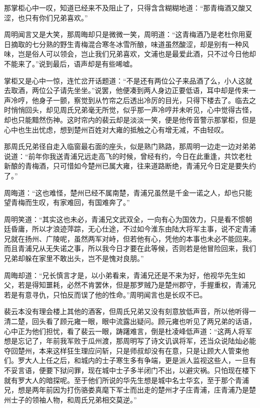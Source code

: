 那掌柜心中一叹，知道已经来不及阻止了，只得含含糊糊地道：“那青梅酒又酸又涩，也只有你们兄弟喜欢。”

周明闻言又是大笑，那周晦却只是微微一笑，周明道：“这青梅酒乃是老杜你用夏日摘取的七分熟的野生青梅混合寒冬冰雪所酿，味道虽然酸涩，却是别有一种风味，岂是俗人可以领会，岂止我们兄弟喜欢，文浦也是最爱此酒，只不过今日他却不能来了。”说到最后，语声却是有些唏嘘。

掌柜又是心中一惊，连忙岔开话题道：“不是还有两位公子来品酒了么，小人这就去取酒，两位公子请先坐坐。”说罢，他便凑到两人身边正要低语，耳中却是传来一声冷哼，他身子一颤，察觉到从竹帘之后透出冷厉的目光，只得下楼去了。临去之时悄悄回头，却见周氏兄弟毫无所觉，似乎那一声冷哼并未听见，心中觉得古怪，却也只能黯然伤神。这时帘内的裴云却是淡淡一笑，便是他传音警示那掌柜，但是心中也生出忧虑，想到楚州百姓对大雍的抵触之心有增无减，不由轻叹。

那周氏兄弟径自走入临窗最右面的座头，似是熟门熟路，那周明一边走一边对弟弟说道：“前年你我送青浦兄远走高飞的时候，曾经有约，今日在此重逢，共饮老杜新酿的青梅酒，只可惜如今楚州已属大雍，往来道路断绝，青浦兄今日定是要失约了。”

周晦道：“这也难怪，楚州已经不属南楚，青浦兄虽然是千金一诺之人，却也只能望青梅而生叹，有家难回，有国难奔了。”

周明笑道：“其实这也未必，青浦兄文武双全，一向有心为国效力，只是看不惯朝廷昏庸，所以才浪迹萍踪，无心仕途，不过如今淮东由陆大将军主事，说不定青浦兄就在扬州、广陵呢，虽然两军对峙，但若他有心，凭他的本事也未必不能回来。而且青浦兄从无失诺之事，所以我今日才要在此等候，否则若是他冒险回来，我们兄弟却躲在家里不敢出头，岂不是愧对良朋。”

周晦却道：“兄长慎言才是，以小弟看来，青浦兄还是不来为好，他视华先生如父，若是得知噩耗，必然不肯罢休，但是那罗贼乃是楚州郡守，手握重权，青浦兄若是有意寻仇，只怕反而误了他的性命。”周明闻言也是长叹不已。

裴云本没有理会楼上其他的酒客，但周氏兄弟又没有刻意放低声音，所以他听得一清二楚，回头看了顾元雍一眼，眼中流露出疑问。顾元雍也听见了两兄弟的话语，心中正为他们担忧，看了裴云一眼，踌躇难言，倒是杜凌峰低声道：“这两人将军想是忘记了，年前我军败于瓜州渡，那周明写了诗文讥讽将军，还当众说陆灿必能夺回楚州，本来这样狂生理应问斩，只是师叔却没有在意，只是让顾大人管束他们。罗大人上任之后，和城内的士子寒生多有争端，更是派人监视这些人，一旦有不妥言语，便要下狱问罪，现在城中士子多半闭门不出，以避灾祸。只怕现在楼下就有罗大人的暗探呢。至于他们所说的华先生想是城中名士华玄，至于那个青浦兄，想是两年前因为打伤骆娄真麾下军士而出走的楚州才子庄青浦，庄青浦乃是楚州士子的领袖人物，和周氏兄弟相交莫逆。”

